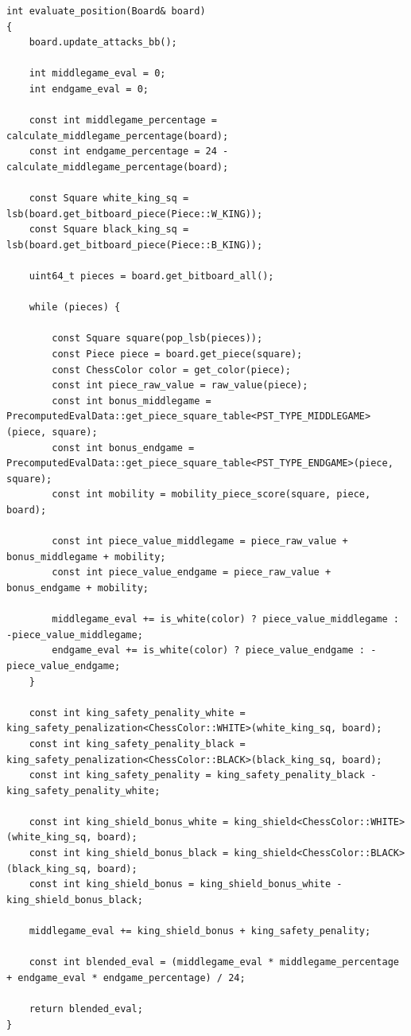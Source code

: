 \begin{lstlisting}[breaklines=true, frame=single, caption={King safety, piece mobility, depending on game phase evaluation.}]
int evaluate_position(Board& board)
{
    board.update_attacks_bb();

    int middlegame_eval = 0;
    int endgame_eval = 0;

    const int middlegame_percentage = calculate_middlegame_percentage(board);
    const int endgame_percentage = 24 - calculate_middlegame_percentage(board);

    const Square white_king_sq = lsb(board.get_bitboard_piece(Piece::W_KING));
    const Square black_king_sq = lsb(board.get_bitboard_piece(Piece::B_KING));

    uint64_t pieces = board.get_bitboard_all();

    while (pieces) {

        const Square square(pop_lsb(pieces));
        const Piece piece = board.get_piece(square);
        const ChessColor color = get_color(piece);
        const int piece_raw_value = raw_value(piece);
        const int bonus_middlegame = PrecomputedEvalData::get_piece_square_table<PST_TYPE_MIDDLEGAME>(piece, square);
        const int bonus_endgame = PrecomputedEvalData::get_piece_square_table<PST_TYPE_ENDGAME>(piece, square);
        const int mobility = mobility_piece_score(square, piece, board);

        const int piece_value_middlegame = piece_raw_value + bonus_middlegame + mobility;
        const int piece_value_endgame = piece_raw_value + bonus_endgame + mobility;

        middlegame_eval += is_white(color) ? piece_value_middlegame : -piece_value_middlegame;
        endgame_eval += is_white(color) ? piece_value_endgame : -piece_value_endgame;
    }

    const int king_safety_penality_white = king_safety_penalization<ChessColor::WHITE>(white_king_sq, board);
    const int king_safety_penality_black = king_safety_penalization<ChessColor::BLACK>(black_king_sq, board);
    const int king_safety_penality = king_safety_penality_black - king_safety_penality_white;

    const int king_shield_bonus_white = king_shield<ChessColor::WHITE>(white_king_sq, board);
    const int king_shield_bonus_black = king_shield<ChessColor::BLACK>(black_king_sq, board);
    const int king_shield_bonus = king_shield_bonus_white - king_shield_bonus_black;

    middlegame_eval += king_shield_bonus + king_safety_penality;

    const int blended_eval = (middlegame_eval * middlegame_percentage + endgame_eval * endgame_percentage) / 24;

    return blended_eval;
}
\end{lstlisting}

